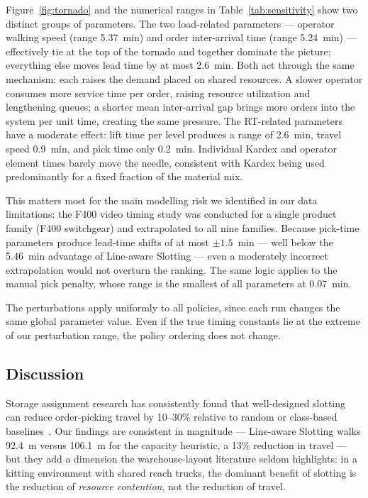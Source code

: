 Figure~\ref{fig:tornado} and the numerical ranges in
Table~\ref{tab:sensitivity} show two distinct groups of parameters.
The two load-related parameters --- operator walking speed (range
5.37~min) and order inter-arrival time (range 5.24~min) --- effectively
tie at the top of the tornado and together dominate the picture;
everything else moves lead time by at most 2.6~min.  Both act through
the same mechanism: each raises the demand placed on shared resources.
A slower operator consumes more service time per order, raising
resource utilization and lengthening queues; a shorter mean
inter-arrival gap brings more orders into the system per unit time,
creating the same pressure.  The RT-related parameters have a moderate
effect: lift time per level produces a range of 2.6~min, travel speed
0.9~min, and pick time only 0.2~min.  Individual Kardex and operator
element times barely move the needle, consistent with Kardex being used
predominantly for a fixed fraction of the material mix.

This matters most for the main modelling risk we identified in our data
limitations: the F400 video timing study was conducted for a single
product family (F400 switchgear) and extrapolated to all nine families.
Because pick-time parameters produce lead-time shifts of at most
$\pm 1.5$~min --- well below the 5.46~min advantage of Line-aware
Slotting --- even a moderately incorrect extrapolation would not
overturn the ranking.  The same logic applies to the manual pick
penalty, whose range is the smallest of all parameters at 0.07~min.

The perturbations apply uniformly to all policies, since each run
changes the same global parameter value.  Even if the true timing
constants lie at the extreme of our perturbation range, the policy
ordering does not change.

\subsection{Discussion}\label{sec:results:discussion}

Storage assignment research has consistently found that well-designed
slotting can reduce order-picking travel by 10--30\% relative to
random or class-based baselines~\cite{dekoster2007,petersen2004}.  Our
findings are consistent in magnitude --- Line-aware Slotting walks
92.4~m versus 106.1~m for the capacity heuristic, a 13\% reduction in
travel --- but they add a dimension the warehouse-layout literature
seldom highlights: in a kitting environment with shared reach trucks,
the dominant benefit of slotting is the reduction of \emph{resource
contention}, not the reduction of travel.


